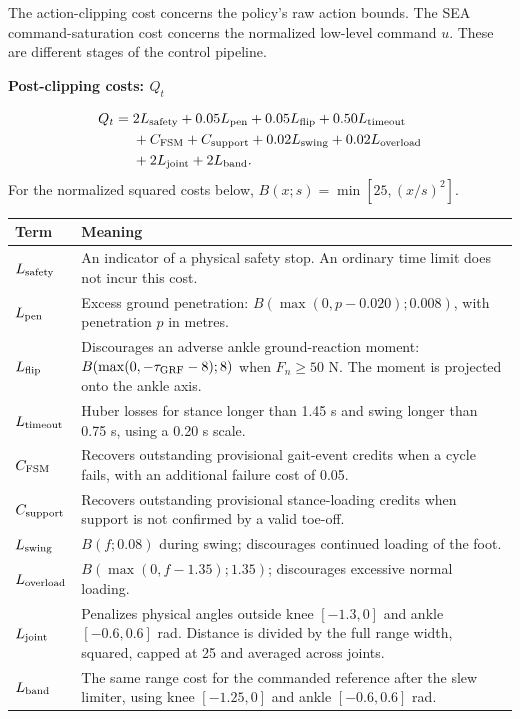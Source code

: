 \documentclass[10pt,a4paper]{article}
\newcommand{\titleline}[1]{{\Large\bfseries\color{blue}#1}\par\vspace{3mm}}
\begin{document}
The action-clipping cost concerns the policy's raw action bounds. The SEA command-saturation cost concerns the normalized low-level command $u$. These are different stages of the control pipeline.

\clearpage
\titleline{Post-clipping costs: $Q_t$}
\begin{align*}
Q_t={}&2L_{\rm safety}+0.05L_{\rm pen}+0.05L_{\rm flip}+0.50L_{\rm timeout}\\
&+C_{\rm FSM}+C_{\rm support}+0.02L_{\rm swing}+0.02L_{\rm overload}\\
&+2L_{\rm joint}+2L_{\rm band}.
\end{align*}
For the normalized squared costs below, $B(x;s)=\min[25,(x/s)^2]$.

\begin{tabularx}{\textwidth}{@{}lX@{}}\toprule
Term & Meaning \\\midrule
$L_{\rm safety}$ & An indicator of a physical safety stop. An ordinary time limit does not incur this cost.\\
$L_{\rm pen}$ & Excess ground penetration: $B(\max(0,p-0.020);0.008)$, with penetration $p$ in metres.\\
$L_{\rm flip}$ & Discourages an adverse ankle ground-reaction moment: $B(\max(0,-\tau_{\rm GRF}-8);8)$ when $F_n\ge50$ N. The moment is projected onto the ankle axis.\\
$L_{\rm timeout}$ & Huber losses for stance longer than 1.45 s and swing longer than 0.75 s, using a 0.20 s scale.\\
$C_{\rm FSM}$ & Recovers outstanding provisional gait-event credits when a cycle fails, with an additional failure cost of 0.05.\\
$C_{\rm support}$ & Recovers outstanding provisional stance-loading credits when support is not confirmed by a valid toe-off.\\
$L_{\rm swing}$ & $B(f;0.08)$ during swing; discourages continued loading of the foot.\\
$L_{\rm overload}$ & $B(\max(0,f-1.35);1.35)$; discourages excessive normal loading.\\
$L_{\rm joint}$ & Penalizes physical angles outside knee $[-1.3,0]$ and ankle $[-0.6,0.6]$ rad. Distance is divided by the full range width, squared, capped at 25 and averaged across joints.\\
$L_{\rm band}$ & The same range cost for the commanded reference after the slew limiter, using knee $[-1.25,0]$ and ankle $[-0.6,0.6]$ rad.\\\bottomrule
\end{tabularx}
\end{document}
